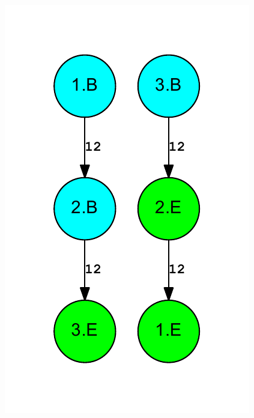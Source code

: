 \documentclass[letterpaper,12pt]{article}
\begin{document}
\begin{figure}
\includegraphics{out.reduced.digraph.pdf}
\end{figure}
\end{document}
